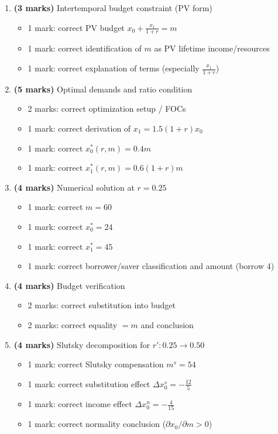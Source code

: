 \documentclass[12pt]{article}
\begin{document}
\begin{enumerate}[label=(\alph*)]
\item \textbf{(3 marks)} Intertemporal budget constraint (PV form)
\begin{itemize}
\item 1 mark: correct PV budget \(x_0+\frac{x_1}{1+r}=m\)
\item 1 mark: correct identification of \(m\) as PV lifetime income/resources
\item 1 mark: correct explanation of terms (especially \(\frac{x_1}{1+r}\))
\end{itemize}

\item \textbf{(5 marks)} Optimal demands and ratio condition
\begin{itemize}
\item 2 marks: correct optimization setup / FOCs
\item 1 mark: correct derivation of \(x_1=1.5(1+r)x_0\)
\item 1 mark: correct \(x_0^*(r,m)=0.4m\)
\item 1 mark: correct \(x_1^*(r,m)=0.6(1+r)m\)
\end{itemize}

\item \textbf{(4 marks)} Numerical solution at \(r=0.25\)
\begin{itemize}
\item 1 mark: correct \(m=60\)
\item 1 mark: correct \(x_0^*=24\)
\item 1 mark: correct \(x_1^*=45\)
\item 1 mark: correct borrower/saver classification and amount (borrow 4)
\end{itemize}

\item \textbf{(4 marks)} Budget verification
\begin{itemize}
\item 2 marks: correct substitution into budget
\item 2 marks: correct equality \(=m\) and conclusion
\end{itemize}

\item \textbf{(4 marks)} Slutsky decomposition for \(r':0.25\to0.50\)
\begin{itemize}
\item 1 mark: correct Slutsky compensation \(\boxed{m^s=54}\)
\item 1 mark: correct substitution effect \(\boxed{\Delta x_0^s=-\frac{12}{5}}\)
\item 1 mark: correct income effect \(\boxed{\Delta x_0^n=-\frac{4}{15}}\)
\item 1 mark: correct normality conclusion (\(\partial x_0/\partial m>0\))
\end{itemize}
\end{enumerate}
\end{document}
